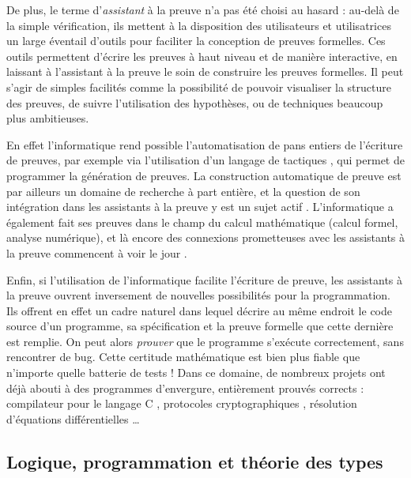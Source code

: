 De plus, le terme d’\emph{assistant} à la preuve n’a pas été choisi au hasard : au-delà
de la simple vérification, ils mettent à la disposition des
utilisateurs et utilisatrices un large éventail d’outils pour
faciliter la conception de preuves formelles.
Ces outils permettent d’écrire
les preuves à haut niveau et de manière interactive,%
en laissant à l’assistant à la preuve le soin de construire les preuves formelles.
Il peut s’agir de simples facilités
comme la possibilité de pouvoir visualiser la structure des
preuves, de suivre l’utilisation des hypothèses, ou de techniques beaucoup plus ambitieuses.

En effet l’informatique rend possible
l’automatisation de pans entiers de l’écriture de preuves,
par exemple via l’utilisation d’un langage de tactiques ,
qui permet de programmer la génération de preuves.
La construction automatique de preuve est par ailleurs un domaine de recherche à part entière,
et la question de son intégration dans les assistants à la
preuve y est un sujet actif .
L’informatique a également fait ses preuves dans le champ du calcul mathématique
(calcul formel, analyse numérique), et là encore des connexions prometteuses
avec les assistants à la preuve commencent à voir le jour .

Enfin, si l’utilisation de l’informatique facilite l’écriture de preuve,
les assistants à la preuve ouvrent inversement
de nouvelles possibilités pour la programmation.
Ils offrent en effet un cadre naturel dans lequel décrire au même endroit
le code source d’un programme, sa spécification et la preuve formelle que cette 
dernière est remplie. On peut alors \emph{prouver} que le
programme s’exécute correctement, sans rencontrer de bug.
Cette certitude mathématique est bien plus fiable que n’importe quelle batterie de tests !
Dans ce domaine, de nombreux projets ont déjà abouti à des programmes d’envergure,
entièrement prouvés corrects : compilateur pour le langage C ,
protocoles cryptographiques ,
résolution d’équations différentielles …

\subsection{Logique, programmation et théorie des types}

